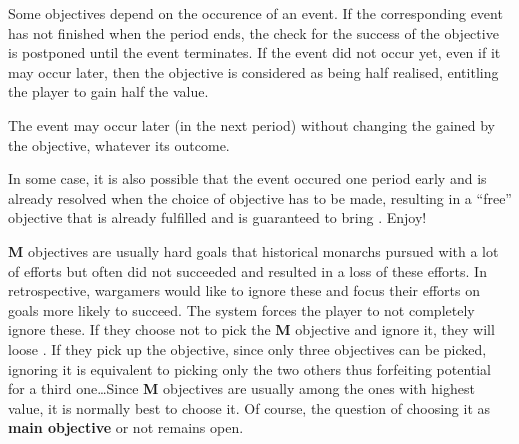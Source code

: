 \bparag Some objectives depend on the occurence of an event.
\bparag If the corresponding event has not finished %
when the period ends, the check for the success of the objective is
postponed until the event %
terminates.
\bparag If the event did not occur yet, even if it may occur later, then
the objective is considered as being half realised, entitling the player
to gain half the \VPs value.

\begin{designnote}
  The event may occur later (in the next period) without changing the
  \VPs gained by the objective, whatever its outcome.

  In some case, it is also possible that the event occured one period
  early and is already resolved when the choice of objective has to be
  made, resulting in a ``free'' objective that is already fulfilled and
  is guaranteed to bring \VPs. Enjoy!
\end{designnote}

\begin{designnote}
  {\bf M} objectives are usually hard goals that historical monarchs pursued
  with a lot of efforts but often did not succeeded and resulted in a loss of
  these efforts. In retrospective, wargamers would like to ignore these and
  focus their efforts on goals more likely to succeed. The system forces the
  player to not completely ignore these. If they choose not to pick the {\bf
    M} objective and ignore it, they will loose \VPs. If they pick up the
  objective, since only three objectives can be picked, ignoring it is
  equivalent to picking only the two others thus forfeiting potential \VPs for
  a third one\ldots Since {\bf M} objectives are usually among the ones with
  highest \VPs value, it is normally best to choose it. Of course, the
  question of choosing it as \textbf{main objective} or not remains open.
\end{designnote}

